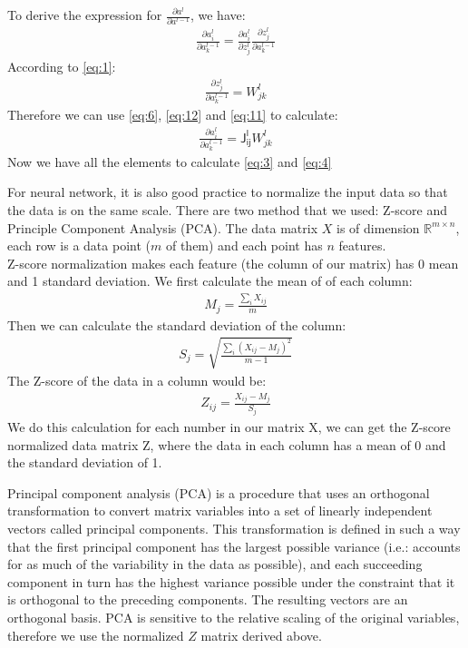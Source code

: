 \documentclass[11pt,letterpaper]{article}
\begin{document}
To derive the expression for $\displaystyle \frac{\partial a^l}{\partial a^{l-1}}$, we have:
\begin{align}
\frac{\partial a_i^l}{\partial a_k^{l-1}}=\frac{\partial a_i^l}{\partial z_j^{l}}\frac{\partial z_j^l}{\partial a_k^{l-1}} \label{eq:11}
\end{align}
According to \ref{eq:1}:
\begin{align}
\frac{\partial z_j^l}{\partial a_k^{l-1}}=W_{jk}^l \label{eq:12}
\end{align}
Therefore we can use \ref{eq:6}, \ref{eq:12} and \ref{eq:11} to calculate:
\begin{align}
\frac{\partial a_i^l}{\partial a_k^{l-1}} = \mathsf{J^l_{ij}}W_{jk}^l \label{eq:13}
\end{align}
Now we have all the elements to calculate \ref{eq:3} and \ref{eq:4}

For neural network, it is also good practice to normalize the input data so that the data is on the same scale. There are two method that we used: Z-score and Principle Component Analysis (PCA). The data matrix $X$ is of dimension $\mathbb{R}^{m\times n}$, each row is a data point ($m$ of them) and each point has $n$ features.\\
Z-score normalization makes each feature (the column of our matrix) has 0 mean and 1 standard deviation. We first calculate the mean of of each column:
\begin{align}
M_j = \frac{\sum_i X_{ij}}{m}
\end{align}
Then we can calculate the standard deviation of the column:
\begin{align}
S_j = \sqrt{\frac{\sum_i {(X_{ij}-M_j)^2}}{m-1}}
\end{align}
The Z-score of the data in a column would be:
\begin{align}
Z_{ij}=\frac{X_{ij}-M_j}{S_j}
\end{align}
We do this calculation for each number in our matrix X, we can get the Z-score normalized data matrix Z, where the data in each column has a mean of 0 and the standard deviation of 1.

Principal component analysis (PCA) is a procedure that uses an orthogonal transformation to convert matrix variables into a set of linearly independent vectors called principal components. This transformation is defined in such a way that the first principal component has the largest possible variance (i.e.: accounts for as much of the variability in the data as possible), and each succeeding component in turn has the highest variance possible under the constraint that it is orthogonal to the preceding components. The resulting vectors are an orthogonal basis. PCA is sensitive to the relative scaling of the original variables, therefore we use the normalized $Z$ matrix derived above\cite{PCA}.
\end{document}
